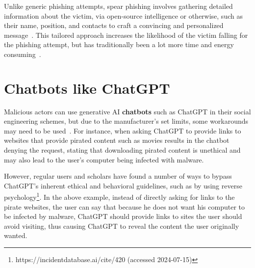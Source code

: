 %
%
Unlike generic phishing attempts, spear phishing involves gathering detailed information about the victim, via open-source intelligence or otherwise, such as their name, position, and contacts to craft a convincing and personalized message~\citep{hadnagy_Social_Engineering_The_Science_2018}. This tailored approach increases the likelihood of the victim falling for the phishing attempt, but has traditionally been a lot more time and energy consuming~\citep{mirsky_Threat_Offensive_AI_Organizations_2023}.










\section{Chatbots like ChatGPT}
\begin{comment}

What to cover:
    - How Generative AI can be used by both cybersecurity professionals and threat actors
    - Circumventing ChatGPT's ethical restrictions with, for example prompt injections attacks or reverse psychology (with at least 1-2 examples)
    - How scholars and regular users have found ways to bypass ChatGPT's ethical restrictions??
    - Pyydetään tekoälyä roolipelaamaan social engineering skenaarioita
    - Kielioppi ja kirjoitusvirheiden korjaus scam viesteissä
    
\end{comment}

%
%
Malicious actors can use generative AI \textbf{chatbots} such as ChatGPT in their social engineering schemes, but due to the manufacturer's set limits, some workarounds may need to be used~\citep{gupta_From_ChatGPT_to_ThreatGPT_2023}. For instance, when asking ChatGPT to provide links to websites that provide pirated content such as movies results in the chatbot denying the request, stating that downloading pirated content is unethical and may also lead to the user's computer being infected with malware.


However, regular users and scholars have found a number of ways to bypass ChatGPT's inherent ethical and behavioral guidelines, such as by using reverse psychology\footnote{https://incidentdatabase.ai/cite/420 (accessed 2024-07-15)}. In the above example, instead of directly asking for links to the pirate websites, the user can say that because he does not want his computer to be infected by malware, ChatGPT should provide links to sites the user should avoid visiting, thus causing ChatGPT to reveal the content the user originally wanted.


